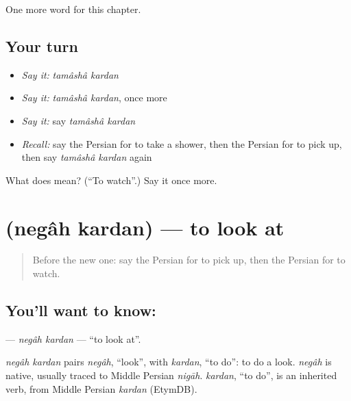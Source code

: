 \begin{grammarlens}[title={What you've built}]
One more word for this chapter.
\end{grammarlens}

\subsection*{Your turn}
\begin{itemize}
\raggedright
  \item \emph{Say it:} \emph{tamâshâ kardan}
  \item \emph{Say it:} \emph{tamâshâ kardan}, once more
  \item \emph{Say it:} say \emph{tamâshâ kardan}
  \item \emph{Recall:} say the Persian for to take a shower, then the Persian for to pick up, then say \emph{tamâshâ kardan} again
\end{itemize}

\begin{tcolorbox}[breakable,colback=teal!4,colframe=teal!35!black,title={Before you move on}]
What does   mean? (\textquotedblleft{}To watch\textquotedblright{}.) Say it once more.
\end{tcolorbox}
\section[\texorpdfstring{\fa{نگاه} \fa{کردن} (negâh kardan)}{نگاه کردن (negâh kardan)}]{  (negâh kardan) — to look at}

\label{lesson:FA-C179-negah-kardan}



\begin{quote}
Before the new one: say the Persian for to pick up, then the Persian for to watch.
\end{quote}

\subsection*{You'll want to know:  }
\textbf{ } — \emph{negâh kardan} — \textquotedblleft{}to look at\textquotedblright{}.

\begin{cousinweb}
\emph{negâh kardan} pairs \emph{negâh}, \textquotedblleft{}look\textquotedblright{}, with \emph{kardan}, \textquotedblleft{}to do\textquotedblright{}: to do a look. \emph{negâh} is native, usually traced to Middle Persian \emph{nigāh}. \emph{kardan}, \textquotedblleft{}to do\textquotedblright{}, is an inherited verb, from Middle Persian \emph{kardan} (EtymDB).
\end{cousinweb}

